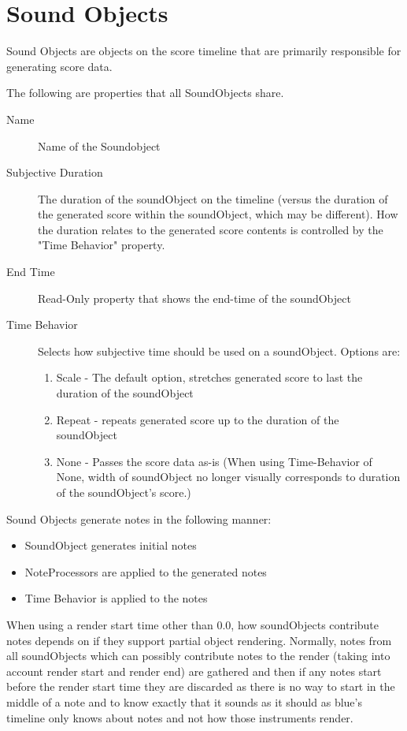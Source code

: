 \section{Sound Objects}
\label{soundObjects}

Sound Objects are objects on the score timeline that are primarily
responsible for generating score data.

The following are properties that all SoundObjects share.

\begin{description}
\item[Name]
Name of the Soundobject
\item[Subjective Duration]
The duration of the soundObject on the timeline (versus the duration of
the generated score within the soundObject, which may be different). How
the duration relates to the generated score contents is controlled by
the "Time Behavior" property.
\item[End Time]
Read-Only property that shows the end-time of the soundObject
\item[Time Behavior]
Selects how subjective time should be used on a soundObject. Options
are:

\begin{enumerate}
\def\labelenumi{\arabic{enumi}.}
\item
  Scale - The default option, stretches generated score to last the
  duration of the soundObject
\item
  Repeat - repeats generated score up to the duration of the soundObject
\item
  None - Passes the score data as-is (When using Time-Behavior of None,
  width of soundObject no longer visually corresponds to duration of the
  soundObject's score.)
\end{enumerate}
\end{description}

Sound Objects generate notes in the following manner:

\begin{itemize}
\item
  SoundObject generates initial notes
\item
  NoteProcessors are applied to the generated notes
\item
  Time Behavior is applied to the notes
\end{itemize}

When using a render start time other than 0.0, how soundObjects
contribute notes depends on if they support partial object rendering.
Normally, notes from all soundObjects which can possibly contribute
notes to the render (taking into account render start and render end)
are gathered and then if any notes start before the render start time
they are discarded as there is no way to start in the middle of a note
and to know exactly that it sounds as it should as blue's timeline only
knows about notes and not how those instruments render.

